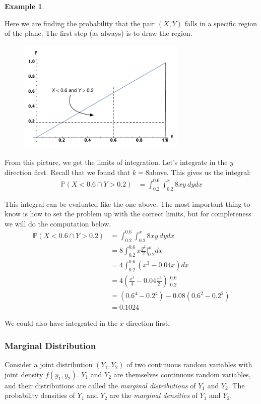 \documentclass[12pt]{article}
\theoremstyle{definition}
\newtheorem*{example}{Example}
\theoremstyle{remark}
\def\P{{\mathbb P}}
\begin{document}
\begin{example}
\begin{enumerate}
Here we are finding the probability that the pair $(X, Y)$ falls in a specific region of the plane. The first step (as always) is to draw the region.
\begin{figure}[H]
\centering
\includegraphics[width=8cm]{region1prob.pdf}
\end{figure}
From this picture, we get the limits of integration. Let's integrate in the $y$ direction first. Recall that we found that $k = 8$above. This gives us the integral:
\begin{align*}
\P(X < 0.6 \cap Y > 0.2) &= \int_{0.2}^{0.6} \int_{0.2}^x 8 x y \: dy dx
\end{align*}

This integral can be evaluated like the one above. The most important thing to know is how to set the problem up with the correct limits, but for completeness we will do the computation below.
\begin{align*}
\P(X < 0.6 \cap Y > 0.2) &= \int_{0.2}^{0.6} \int_{0.2}^x 8 x y \: dy dx \\
&= 8 \int_{0.2}^{0.6} x \frac{y^2}{2} \Bigr|_{0.2}^x dx \\
&= 4 \int_{0.2}^{0.6} (x^3 - 0.04x) dx \\
&= 4 \left( \frac{x^4}{4} - 0.04 \frac{x^2}{2} \right)\Bigr|_{0.2}^{0.6}\\
&= \left(0.6^4 - 0.2^4\right) - 0.08\left(0.6^2 - 0.2^2\right) \\
&= 0.1024
\end{align*}

We could also have integrated in the $x$ direction first.
\end{enumerate}
\end{example}

\subsubsection{Marginal Distribution}
Consider a joint distribution $(Y_1, Y_2)$ of two continuous random variables with joint density $f(y_1, y_2)$. $Y_1$ and $Y_2$ are themselves continuous random variables, and their distributions are called the \emph{marginal distributions} of $Y_1$ and $Y_2$. The probability densities of $Y_1$ and $Y_2$ are the \emph{marginal densities} of $Y_1$ and $Y_2$.\\
\end{document}
